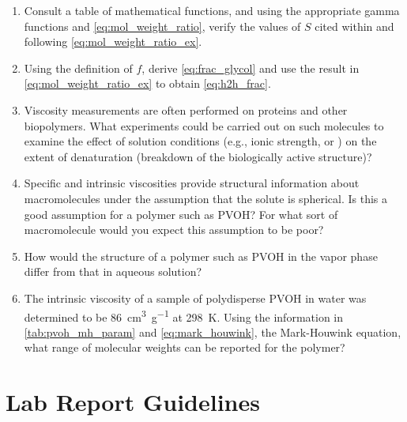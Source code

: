 \begin{enumerate}
	\item Consult a table of mathematical functions, and using the appropriate gamma functions and \cref{eq:mol_weight_ratio}, verify the values of \( S \) cited within and following \cref{eq:mol_weight_ratio_ex}.
	\item Using the definition of \( f \), derive \cref{eq:frac_glycol} and use the result in \cref{eq:mol_weight_ratio_ex} to obtain \cref{eq:h2h_frac}.
	\item Viscosity measurements are often performed on proteins and other biopolymers. 
	What experiments could be carried out on such molecules to examine the effect of solution conditions (e.g., ionic strength, or \ch{\pH}) on the extent of denaturation (breakdown of the biologically active structure)?
	\item Specific and intrinsic viscosities provide structural information about macromolecules under the assumption that the solute is spherical. 
	Is this a good assumption for a polymer such as PVOH? 
	For what sort of macromolecule would you expect this assumption to be poor?
	\item How would the structure of a polymer such as PVOH in the vapor phase differ from that in aqueous solution?
	\item The intrinsic viscosity of a sample of polydisperse PVOH in water was determined to be \qty{86}{\cm\cubed \per \g} at \qty{298}{\K}. 
	Using the information in \cref{tab:pvoh_mh_param} and \cref{eq:mark_houwink}, the Mark-Houwink equation, what range of molecular weights can be reported for the polymer?
\end{enumerate}

\section{Lab Report Guidelines} %
\label{sec:lab_report_guidelines}


